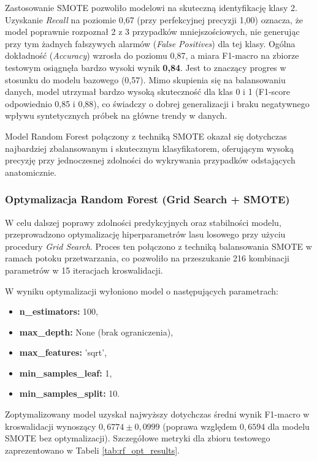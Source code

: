 \documentclass[12pt, a4paper]{article}
\begin{document}
Zastosowanie SMOTE pozwoliło modelowi na skuteczną identyfikację klasy 2. Uzyskanie \textit{Recall} na poziomie 0,67 (przy perfekcyjnej precyzji 1,00) oznacza, że model poprawnie rozpoznał 2 z 3 przypadków mniejszościowych, nie generując przy tym żadnych fałszywych alarmów (\textit{False Positives}) dla tej klasy. Ogólna dokładność (\textit{Accuracy}) wzrosła do poziomu 0,87, a miara F1-macro na zbiorze testowym osiągnęła bardzo wysoki wynik \textbf{0,84}. Jest to znaczący progres w stosunku do modelu bazowego (0,57). Mimo skupienia się na balansowaniu danych, model utrzymał bardzo wysoką skuteczność dla klas 0 i 1 (F1-score odpowiednio 0,85 i 0,88), co świadczy o dobrej generalizacji i braku negatywnego wpływu syntetycznych próbek na główne trendy w danych.

Model Random Forest połączony z techniką SMOTE okazał się dotychczas najbardziej zbalansowanym i skutecznym klasyfikatorem, oferującym wysoką precyzję przy jednoczesnej zdolności do wykrywania przypadków odstających anatomicznie.



\subsubsection{Optymalizacja Random Forest (Grid Search + SMOTE)}

W celu dalszej poprawy zdolności predykcyjnych oraz stabilności modelu, przeprowadzono optymalizację hiperparametrów lasu losowego przy użyciu procedury \textit{Grid Search}. Proces ten połączono z techniką balansowania SMOTE w ramach potoku przetwarzania, co pozwoliło na przeszukanie 216 kombinacji parametrów w 15 iteracjach kroswalidacji.

W wyniku optymalizacji wyłoniono model o następujących parametrach:
\begin{itemize}
    \item \textbf{n\_estimators:} 100,
    \item \textbf{max\_depth:} None (brak ograniczenia),
    \item \textbf{max\_features:} 'sqrt',
    \item \textbf{min\_samples\_leaf:} 1,
    \item \textbf{min\_samples\_split:} 10.
\end{itemize}

Zoptymalizowany model uzyskał najwyższy dotychczas średni wynik F1-macro w kroswalidacji wynoszący $0{,}6774 \pm 0{,}0999$ (poprawa względem $0{,}6594$ dla modelu SMOTE bez optymalizacji). Szczegółowe metryki dla zbioru testowego zaprezentowano w Tabeli \ref{tab:rf_opt_results}.
\end{document}
